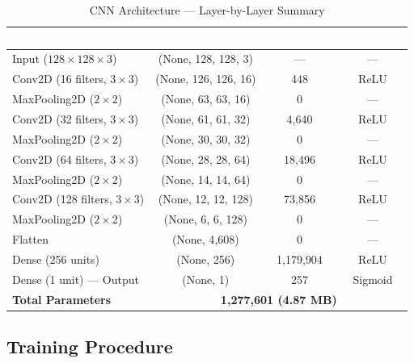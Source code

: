 \documentclass[12pt,a4paper]{article}
\begin{document}
\begin{table}[H]
\centering
\renewcommand{\arraystretch}{1.3}
\begin{tabular}{|l|c|c|c|}
\hline
\rowcolor{black}
\textcolor{white}{\textbf{Layer}} &
\textcolor{white}{\textbf{Output Shape}} &
\textcolor{white}{\textbf{Parameters}} &
\textcolor{white}{\textbf{Activation}} \\
\hline
Input ($128\times128\times3$)      & (None, 128, 128, 3)   & ---         & ---     \\
\hline
Conv2D (16 filters, $3\times3$)    & (None, 126, 126, 16)  & 448         & ReLU    \\
\hline
MaxPooling2D ($2\times2$)          & (None,  63,  63, 16)  & 0           & ---     \\
\hline
Conv2D (32 filters, $3\times3$)    & (None,  61,  61, 32)  & 4{,}640     & ReLU    \\
\hline
MaxPooling2D ($2\times2$)          & (None,  30,  30, 32)  & 0           & ---     \\
\hline
Conv2D (64 filters, $3\times3$)    & (None,  28,  28, 64)  & 18{,}496    & ReLU    \\
\hline
MaxPooling2D ($2\times2$)          & (None,  14,  14, 64)  & 0           & ---     \\
\hline
Conv2D (128 filters, $3\times3$)   & (None,  12,  12, 128) & 73{,}856    & ReLU    \\
\hline
MaxPooling2D ($2\times2$)          & (None,   6,   6, 128) & 0           & ---     \\
\hline
Flatten                            & (None, 4{,}608)        & 0           & ---     \\
\hline
Dense (256 units)                  & (None, 256)           & 1{,}179{,}904 & ReLU  \\
\hline
Dense (1 unit) --- Output          & (None, 1)             & 257         & Sigmoid \\
\hline
\textbf{Total Parameters}          & \multicolumn{3}{c|}{\textbf{1{,}277{,}601 \quad (4.87 MB)}} \\
\hline
\end{tabular}
\caption{CNN Architecture --- Layer-by-Layer Summary}
\end{table}

\FloatBarrier

\subsection{Training Procedure}
\end{document}
